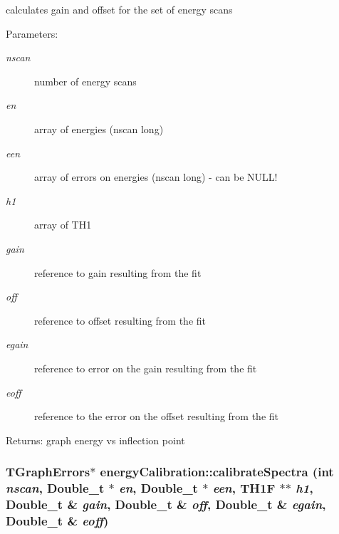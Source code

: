calculates gain and offset for the set of energy scans \begin{Desc}
\item[Parameters:]
\begin{description}
\item[{\em nscan}]number of energy scans \item[{\em en}]array of energies (nscan long) \item[{\em een}]array of errors on energies (nscan long) - can be NULL! \item[{\em h1}]array of TH1 \item[{\em gain}]reference to gain resulting from the fit \item[{\em off}]reference to offset resulting from the fit \item[{\em egain}]reference to error on the gain resulting from the fit \item[{\em eoff}]reference to the error on the offset resulting from the fit \end{description}
\end{Desc}
\begin{Desc}
\item[Returns:]graph energy vs inflection point \end{Desc}
\subsubsection{\setlength{\rightskip}{0pt plus 5cm}TGraph\-Errors$\ast$ energy\-Calibration::calibrate\-Spectra (int {\em nscan}, Double\_\-t $\ast$ {\em en}, Double\_\-t $\ast$ {\em een}, TH1F $\ast$$\ast$ {\em h1}, Double\_\-t \& {\em gain}, Double\_\-t \& {\em off}, Double\_\-t \& {\em egain}, Double\_\-t \& {\em eoff})\hspace{0.3cm}{\tt  [inline]}}\label{classenergyCalibration_092637f656c0b88d57797e3ebd0f3e58}


